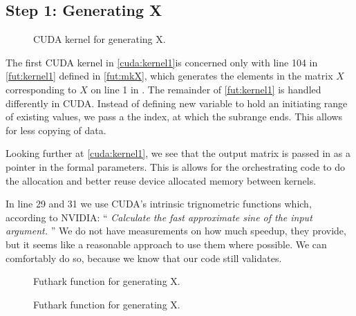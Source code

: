 \subsection{
    Step 1: Generating X
}

\begin{figure}[H]
    \centering
    \caption{CUDA kernel for generating X.}
    \label{cuda:kernel1}
\end{figure}



The first CUDA kernel in \autoref{cuda:kernel1}is concerned only with line 104
in \autoref{fut:kernel1} defined in \autoref{fut:mkX},
which generates the elements in the matrix \(X\) corresponding to \(X\) on line
1 in \cite[Algorithm 1, \textsc{BFAST}, p. 3]{bfast}.
The remainder of \autoref{fut:kernel1} is handled differently in CUDA. Instead of
defining new variable to hold an initiating range of existing values, we pass a
the index, at which the subrange ends. This allows for less copying of data.

Looking further at \autoref{cuda:kernel1}, we see that the output matrix is
passed in as a pointer in the formal parameters. This is allows for the
orchestrating code to do the allocation and better reuse device allocated memory
between kernels.

In line 29 and 31 we use CUDA's intrinsic trignometric functions which,
according to NVIDIA:
\enquote{
    \textit{
Calculate the fast approximate sine of the input argument.
}
}
We do not have measurements on how much speedup, they provide, but it seems like
a reasonable approach to use them where possible. We can comfortably do so,
because we know that our code still validates.

\begin{figure}[H]
    \centering
    \caption{Futhark function for generating X.}
    \label{fut:kernel1}
\end{figure}


\begin{figure}[H]
    \centering
    \caption{Futhark function for generating X.}
    \label{fut:mkX}
\end{figure}




